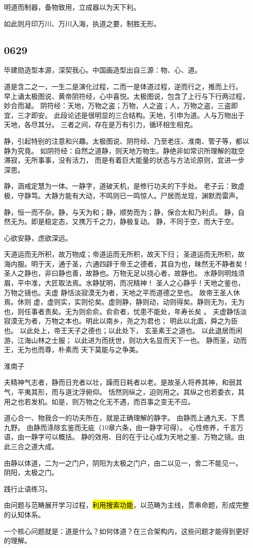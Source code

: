明道而制器，备物致用，立成器以为天下利。

如此则月印万川、万川入海，执道之要，制胜无形。

\subsection{0629}

毕建勋造型本源，深契我心。中国画造型出自三源：物、心、道。

道是含二之一，一生二是演化过程，二而一是体道过程，逆而行之，推而上行。
早上诵太极图说、黄帝阴符经，心中喜悦。太极图说，包含了上行与下行两过程，妙合而凝。
阴符经：天地，万物之盗；万物，人之盗；人，万物之盗，三盗即宜，三才即安。
此段论述是很明显的三合结构。天地，引申为道。人与万物出于天地，各尽其分。
三者之间，存在是万有引力，循环相生相克。

静，引起特别的注意和兴趣。太极图说、阴符经、乃至老庄、淮南、管子等，都以静为究竟。
如阴符经：自然之道静，则天地万物生。静绝非如常识所理解的耽空滞寂，无所事事，没有活力，
而是有着巨大能量的状态与方法论原则，宜进一步深思。

静，涵戒定慧为一体。一静字，道破天机，是修行功夫的下手处。
老子云：致虚极，守静笃。大静方能有大动，不鸣则已一鸣惊人。尸居而龙现，渊默而雷声。

静，恒一而不杂。静，与天为和；静，顺势而为；静，保合太和乃利贞。
静，自然无为。即是稳定态，又携万千之力，静极复动。
静，不同于空，而大于空。

心欲安静，虑欲深远。

\begin{shadequote}
天道运而无所积，故万物成；帝道运而无所积，故天下归；
圣道运而无所积，故海内服。明于天，通于圣，六通四辟于帝王之德者，其自为也，昧然无不静者矣！
圣人之静也，非曰静也善，故静也。万物无足以挠心者，故静也。
水静则明烛须眉，平中准，大匠取法焉。水静犹明，而况精神！
圣人之心静乎！天地之鉴也，万物之镜也。夫虚 静恬淡寂漠无为者，天地之平而道德之至也。
故帝王圣人休焉。休则 虚，虚则实，实则伦矣。虚则静，静则动，动则得矣。静则无为，无为也，则任事者责矣。无为则俞俞。俞俞者，忧患不能处，年寿长矣 。
夫虚静恬淡寂漠无为者，万物之本也。明此以南乡，尧之为君也； 明此以北面，舜之为臣也。
以此处上，帝王天子之德也；以此处下， 玄圣素王之道也。
以此退居而闲游，江海山林之士服；
以此进为而抚世，则功大名显而天下一也。
静而圣，动而王，无为也而尊，朴素而 天下莫能与之争美。
\end{shadequote}

淮南子
\begin{shadequote}
夫精神气志者，静而日充者以壮，躁而日耗者以老。是故圣人将养其神，和弱其气，平夷其形，而与道沈浮俯仰。
恬然则纵之，迫则用之。其纵之也若委衣，其用之也若发机。如是，则万物之化无不遇，而百事之变无不应。
\end{shadequote}

道心合一、物我合一的功夫所在，就是正确理解的静字。
由静而上通九天、下贯九野。
由静而涤除玄鉴而无疵（10章六条，由一静字可得）。
心性修养，千言万语，由一静字可以概括。
静的效用、目的在于让心成为天地之鉴、万物之镜。由此三合之道大成。

由静以体道，二为一之门户，阴阳为太极之门户，由二以见一，舍二不能见一。
阴阳，太极之门。

践行止语练习。

由问题与范畴展开学习过程，\hl{利用搜索功能}，以范畴为主线，贯串命题，形成完整的认知体系。

一个核心问题就是：道是什么？如何体道？在三合架构内，这些问题才能得到更好的理解。
